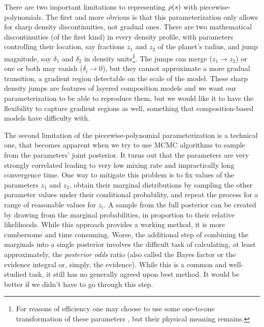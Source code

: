 There are two important limitations to representing $\rho(s)$ with
piecewise-polynomials. The first and more obvious is that this parameterization
only allows for sharp density discontinuities, not gradual ones. There are two
mathematical discontinuities (of the first kind) in every density profile, with
parameters controlling their location, say fractions $z_1$ and $z_2$ of the
planet's radius, and jump magnitude, say $\delta_1$ and $\delta_2$ in density
units\footnote{For reasons of efficiency one may choose to use some one-to-one
transformation of these parameters \citep[e.g.][Appendix B]{Movshovitz2020}, but
their physical meaning remains.}. The jumps can merge ($z_1\to{}z_2$) or one or
both may vanish ($\delta_i\to{0}$), but they cannot approximate a more gradual
transition, a gradient region detectable on the scale of the model. These sharp
density jumps are features of layered composition models and we want our
parameterization to be able to reproduce them, but we would like it to have the
flexibility to capture gradient regions as well, something that
composition-based models have difficulty with.

The second limitation of the piecewise-polynomial parameterization is a
technical one, that becomes apparent when we try to use MCMC algorithms to
sample from the parameters' joint posterior. It turns out that the parameters
are very strongly correlated leading to very low mixing rate and impractically
long convergence time. One way to mitigate this problem is to fix values of the
parameters $z_1$ and $z_2$, obtain their marginal distributions by sampling the
other parameter values under their conditional probability, and repeat the
process for a range of reasonable values for $z_i$. A sample from the full
posterior can be created by drawing from the marginal probabilities, in
proportion to their relative likelihoods. While this approach provides a working
method, it is more cumbersome and time consuming. Worse, the additional step of
combining the marginals into a single posterior involves the difficult task of
calculating, at least approximately, the \emph{posterior odds} ratio (also
called the Bayes factor or the evidence integral or, simply, the evidence).
While this is a common and well-studied task, it still has no generally agreed
upon best method. It would be better if we didn't have to go through this step.

